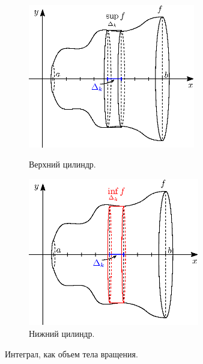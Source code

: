 \documentclass[12pt]{article}
\theoremstyle{definition}
\begin{document}
\begin{figure}[H]
	\centering
	\begin{subfigure}[b]{0.5\textwidth}
		\centering
		\includegraphics[width=0.8\textwidth]{26_2.eps}
		\label{26_2}
		\caption{Верхний цилиндр.}
	\end{subfigure}
	\begin{subfigure}[b]{0.49\textwidth}
		\centering
		\includegraphics[width=0.82\textwidth]{26_3.eps}
		\caption{Нижний цилиндр.}
		\label{26_3}
	\end{subfigure}
	\caption{Интеграл, как объем тела вращения.}
	\label{fig:Объем тела вращения}
\end{figure}
\end{document}
